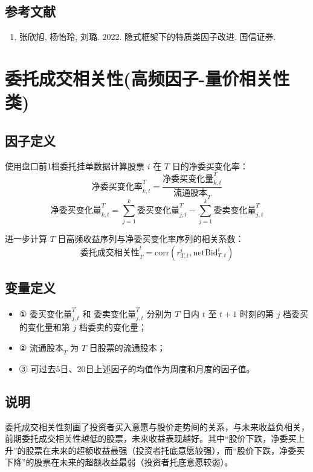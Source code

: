 \documentclass{article}
\begin{document}
\subsection{参考文献}
\begin{enumerate}
    \item 张欣旭, 杨怡玲, 刘璐. 2022. 隐式框架下的特质类因子改进. 国信证券.
\end{enumerate}

\section{委托成交相关性(高频因子-量价相关性类)}

\subsection{因子定义}

使用盘口前1档委托挂单数据计算股票 \( i \) 在 \( T \) 日的净委买变化率：
\begin{equation}
    \text{净委买变化率}_{k,t}^T = \frac{\text{净委买变化量}_{k,t}^T}{\text{流通股本}_T}
\end{equation}
\begin{equation}
    \text{净委买变化量}_{k,t}^T = \sum_{j=1}^{k} \text{委买变化量}_{j,t}^T - \sum_{j=1}^{k} \text{委卖变化量}_{j,t}^T
\end{equation}

进一步计算 \( T \) 日高频收益序列与净委买变化率序列的相关系数：
\begin{equation}
    \text{委托成交相关性}^t_T = \mathrm{corr}(r_{T,t}^i, \mathrm{netBid}_{T,t}^i)
\end{equation}

\subsection{变量定义}
\begin{itemize}
    \item ① \( \text{委买变化量}_{j,t}^T \) 和 \( \text{委卖变化量}_{j,t}^T \) 分别为 \( T \) 日内 \( t \) 至 \( t+1 \) 时刻的第 \( j \) 档委买的变化量和第 \( j \) 档委卖的变化量；
    \item ② \( \text{流通股本}_T \) 为 \( T \) 日股票的流通股本；
    \item ③ 可过去5日、20日上述因子的均值作为周度和月度的因子值。
\end{itemize}

\subsection{说明}
委托成交相关性刻画了投资者买入意愿与股价走势间的关系，与未来收益负相关，前期委托成交相关性越低的股票，未来收益表现越好。其中“股价下跌，净委买上升”的股票在未来的超额收益最强（投资者托底意愿较强），而“股价下跌，净委买下降”的股票在未来的超额收益最弱（投资者托底意愿较弱）。
\end{document}
